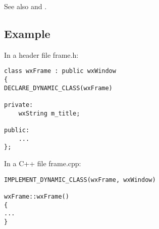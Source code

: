 See also  and .

\subsection{Example}

In a header file frame.h:

\begin{verbatim}
class wxFrame : public wxWindow
{
DECLARE_DYNAMIC_CLASS(wxFrame)

private:
    wxString m_title;

public:
    ...
};
\end{verbatim}

In a C++ file frame.cpp:

\begin{verbatim}
IMPLEMENT_DYNAMIC_CLASS(wxFrame, wxWindow)

wxFrame::wxFrame()
{
...
}
\end{verbatim}


